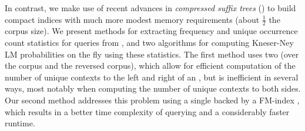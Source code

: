 %
%
%
%
 
In contrast, we make use of recent advances in  \emph{compressed suffix trees} (\CSTs) \cite{rno-talg11} 
to build compact indices with much more modest memory requirements (about
$\frac{1}{2}$ the corpus size).
We present methods for extracting frequency and unique occurrence count
statistics for \ngram queries from \CSTs,  and two algorithms for
computing Kneser-Ney LM probabilities on the fly using these statistics.
The first method uses two \CSTs (over the corpus and the reversed corpus),
which allow for efficient computation of the number of unique contexts to the left
and right of an \ngram, 
but is inefficient in several ways, most notably when computing the
number of unique contexts to both sides.
Our second method addresses this problem using a single \CST backed by
a FM-index \cite{fmmn-talg07}, which results in a better time
complexity of querying and a considerably faster runtime.
 
